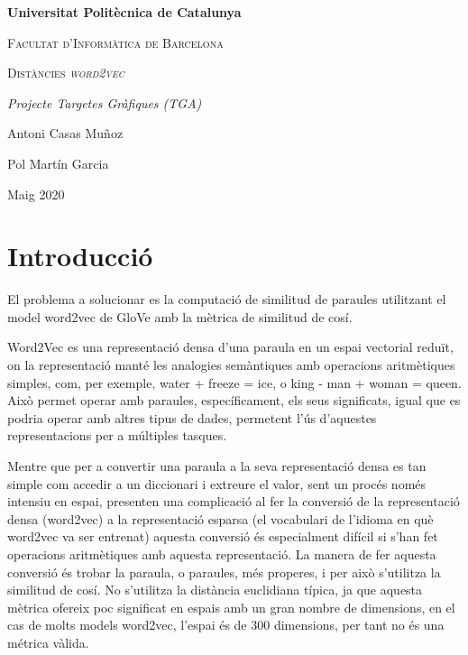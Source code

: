\documentclass[catalan,10pt,a4paper]{article}
\begin{document}
	\begin{titlepage}
		\centering
		{\bfseries\LARGE Universitat Politècnica de Catalunya \par}
		\vspace{1cm}
		{\scshape\Large Facultat d'Informàtica de Barcelona\par}
		\vspace{3cm}
		{\scshape\Huge Distàncies \textit{word2vec} \par}
		\vspace{3cm}
		{\itshape\Large Projecte Targetes Gràfiques (TGA) \par}
		\vfill
		{\Large Antoni Casas Muñoz \par}
		{\Large Pol Martín Garcia \par}
		\vfill
		{\Large Maig 2020 \par}
	\end{titlepage}
	
	\newpage
	
\section*{Introducció}

El problema a solucionar es la computació de similitud de paraules utilitzant el model word2vec de GloVe amb la mètrica de similitud de cosí.

Word2Vec es una representació densa d'una paraula en un espai vectorial reduït, on la representació manté les analogies semàntiques amb operacions aritmètiques simples, com, per exemple, water + freeze = ice, o king - man + woman = queen. Això permet operar amb paraules, específicament, els seus significats, igual que es podria operar amb altres tipus de dades, permetent l'ús d'aquestes representacions per a múltiples tasques.

Mentre que per a convertir una paraula a la seva representació densa es tan simple com accedir a un diccionari i extreure el valor, sent un procés només intensiu en espai, presenten una complicació al fer la conversió de la representació densa (word2vec) a la representació esparsa (el vocabulari de l'idioma en què word2vec va ser entrenat) aquesta conversió és especialment difícil si s'han fet operacions aritmètiques amb aquesta representació. La manera de fer aquesta conversió és trobar la paraula, o paraules, més properes, i per això s'utilitza la similitud de cosí. No s'utilitza la distància euclidiana típica, ja que aquesta mètrica ofereix poc significat en espais amb un gran nombre de dimensions, en el cas de molts models word2vec, l'espai és de 300 dimensions, per tant no és una métrica vàlida.
\end{document}
